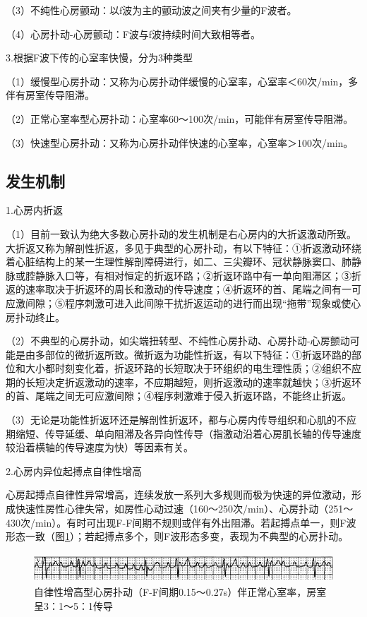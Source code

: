 （3）不纯性心房颤动：以f波为主的颤动波之间夹有少量的F波者。

（4）心房扑动-心房颤动：F波与f波持续时间大致相等者。

3.根据F波下传的心室率快慢，分为3种类型

（1）缓慢型心房扑动：又称为心房扑动伴缓慢的心室率，心室率＜60次/min，多伴有房室传导阻滞。

（2）正常心室率型心房扑动：心室率60～100次/min，可能伴有房室传导阻滞。

（3）快速型心房扑动：又称为心房扑动伴快速的心室率，心室率＞100次/min。

\protect\hypertarget{text00020.htmlux5cux23subid193}{}{}

\subsection{发生机制}

1.心房内折返

（1）目前一致认为绝大多数心房扑动的发生机制是右心房内的大折返激动所致。大折返又称为解剖性折返，多见于典型的心房扑动，有以下特征：①折返激动环绕着心脏结构上的某一生理性解剖障碍进行，如二、三尖瓣环、冠状静脉窦口、肺静脉或腔静脉入口等，有相对恒定的折返环路；②折返环路中有一单向阻滞区；③折返的速率取决于折返环的周长和激动的传导速度；④折返环的首、尾端之间有一可应激间隙；⑤程序刺激可进入此间隙干扰折返运动的进行而出现“拖带”现象或使心房扑动终止。

（2）不典型的心房扑动，如尖端扭转型、不纯性心房扑动、心房扑动-心房颤动可能是由多部位的微折返所致。微折返为功能性折返，有以下特征：①折返环路的部位和大小都时刻变化着，折返环路的长短取决于环组织的电生理性质；②组织不应期的长短决定折返激动的速率，不应期越短，则折返激动的速率就越快；③折返环的首、尾端之间无可应激间隙；④程序刺激难于侵入折返环路，不能终止折返。

（3）无论是功能性折返环还是解剖性折返环，都与心房内传导组织和心肌的不应期缩短、传导延缓、单向阻滞及各异向性传导（指激动沿着心房肌长轴的传导速度较沿着横轴的传导速度为快）等因素有关。

2.心房内异位起搏点自律性增高

心房起搏点自律性异常增高，连续发放一系列大多规则而极为快速的异位激动，形成快速性房性心律失常，如房性心动过速（160～250次/min）、心房扑动（251～430次/min）。有时可出现F-F间期不规则或伴有外出阻滞。若起搏点单一，则F波形态一致（图\ref{fig13-5}）；若起搏点多个，则F波形态多变，表现为不典型的心房扑动。

\begin{figure}[!htbp]
 \centering
 \includegraphics[width=5.58333in,height=0.42708in]{./images/Image00213.jpg}
 \captionsetup{justification=centering}
 \caption{自律性增高型心房扑动（F-F间期0.15～0.27s）伴正常心室率，房室呈3：1～5：1传导}
 \label{fig13-5}
  \end{figure} 

